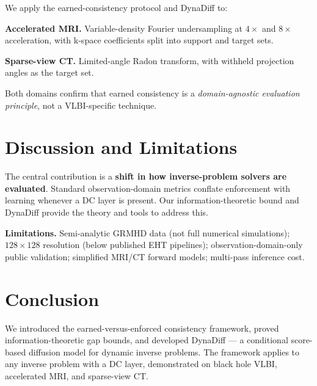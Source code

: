 \documentclass[11pt]{article}
\begin{document}
We apply the earned-consistency protocol and DynaDiff to:

\textbf{Accelerated MRI.} Variable-density Fourier undersampling at $4\times$ and $8\times$ acceleration, with k-space coefficients split into support and target sets.

\textbf{Sparse-view CT.} Limited-angle Radon transform, with withheld projection angles as the target set.

Both domains confirm that earned consistency is a \emph{domain-agnostic evaluation principle}, not a VLBI-specific technique.

\section{Discussion and Limitations}

The central contribution is a \textbf{shift in how inverse-problem solvers are evaluated}. Standard observation-domain metrics conflate enforcement with learning whenever a DC layer is present. Our information-theoretic bound and DynaDiff provide the theory and tools to address this.

\textbf{Limitations.} Semi-analytic GRMHD data (not full numerical simulations); $128\times128$ resolution (below published EHT pipelines); observation-domain-only public validation; simplified MRI/CT forward models; multi-pass inference cost.

\section{Conclusion}

We introduced the earned-versus-enforced consistency framework, proved information-theoretic gap bounds, and developed DynaDiff --- a conditional score-based diffusion model for dynamic inverse problems. The framework applies to any inverse problem with a DC layer, demonstrated on black hole VLBI, accelerated MRI, and sparse-view CT.



\end{document}
